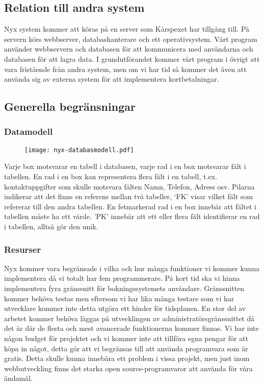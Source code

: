 \documentclass[a4paper, twoside, 11pt, titlepage]{article}
\begin{document}
	\subsection{Relation till andra system}


	Nyx system kommer att köras på en server som Kårspexet har tillgång till. På servern körs webbserver, databashanterare och ett operativsystem. Vårt program använder webbservern och databasen för att kommunicera med användarna och databasen för att lagra data. I grundutförandet kommer vårt program i övrigt att vara fristående från andra system, men om vi har tid så kommer det även att använda sig av externa system för att implementera kortbetalningar.

	\subsection{Generella begränsningar}



		\subsubsection{Datamodell}


		\begin{figure}[ht] \centering \texttt{[image: nyx-databasmodell.pdf]} \end{figure} \FloatBarrier

		Varje box motsvarar en tabell i databasen, varje rad i en box motsvarar fält i tabellen. En rad i en box kan representera flera fält i en tabell, t.ex. kontaktuppgifter som skulle motsvara fälten Namn, Telefon, Adress osv. Pilarna indikerar att det finns en referens mellan två tabeller, ‘FK’ visar vilket fält som refererar till den andra tabellen. En fetmarkerad rad i en box innebär att fältet i tabellen måste ha ett värde. ’PK’ innebär att ett eller flera fält identifierar en rad i tabellen, alltså gör den unik.

		\subsubsection{Resurser}


		Nyx kommer vara begränsade i vilka och hur många funktioner vi kommer kunna implementera då vi totalt har fem programmerare. På kort tid ska vi hinna implementera fyra gränssnitt för bokningssystemets användare. Gränssnitten kommer behöva testas men eftersom vi har lika många testare som vi har utvecklare kommer inte detta utgöra ett hinder för tidsplanen. En stor del av arbetet kommer behöva läggas på utvecklingen av administratörsgränssnittet då det är där de flesta och mest avancerade funktionerna kommer finnas. Vi har inte någon budget för projektet och vi kommer inte att tillföra egna pengar för att köpa in något, detta gör att vi begränsas till att använda programvara som är gratis. Detta skulle kunna innebära ett problem i vissa projekt, men just inom webbutveckling finns det starka open source-programvaror att använda för våra ändamål.
\end{document}
